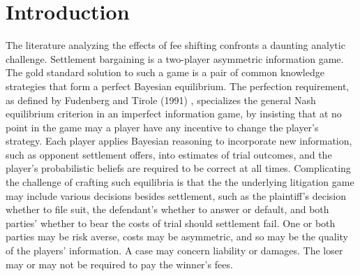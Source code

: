 \documentclass{article}
\begin{document}
\section{Introduction}
The literature analyzing the effects of fee shifting confronts a daunting analytic challenge. Settlement bargaining is a two-player asymmetric information game. The gold standard solution to such a game is a pair of common knowledge strategies that form a perfect Bayesian equilibrium. The perfection requirement, as defined by Fudenberg and Tirole (1991) \cite{fudenberg}, specializes the general Nash \cite{nash} equilibrium criterion in an imperfect information game, by insisting that at no point in the game may a player have any incentive to change the player's strategy. Each player applies Bayesian reasoning to incorporate new information, such as opponent settlement offers, into estimates of trial outcomes, and the player's probabilistic beliefs are required to be correct at all times. Complicating the challenge of crafting such equilibria is that the the underlying litigation game may include various decisions besides settlement, such as the plaintiff's decision whether to file suit, the defendant's whether to answer or default, and both parties' whether to bear the costs of trial should settlement fail. One or both parties may be risk averse, costs may be asymmetric, and so may be the quality of the players' information. A case may concern liability or damages. The loser may or may not be required to pay the winner's fees.
\end{document}
